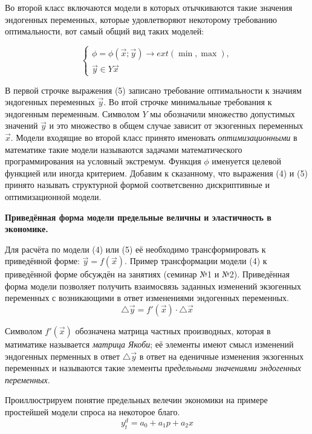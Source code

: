\documentclass[12pt,a4paper]{article}
\begin{document}
Во второй класс включаются модели в которых отычкиваются такие значения эндогенных переменных, которые удовлетворяют некоторому требованию оптимальности, вот самый общий вид таких моделей:

\begin{equation}
\begin{cases}
\phi = \phi(\vec{x};\vec{y}) \rightarrow ext (\min, \max),\\
\vec{y} \in Y{\vec{x}}
\end{cases}
\end{equation}

В первой строчке выражения (5) записано требование оптимальности к значиям эндогенных переменных $\vec{y}$. Во втой строчке минимальные требования к эндогенным переменным. Символом $Y$ мы обозначили множество допустимых значений $\vec{y}$ и это множество в общем случае зависит от экзогенных переменных $\vec{x}$. Модели входящие во второй класс принято именовать \textit{оптимизационными} в математике такие модели называются задачами математического программирования на условный экстремум. Функция $\phi$ именуется целевой функцией или иногда критерием. Добавим к сказанному, что выражения (4) и (5) принято называть структурной формой соответсвенно дискриптивные и оптимизационной модели. 

\begin{center}
\textbf{Приведённая форма модели предельные величны и эластичность в экономике.}
\end{center}

Для расчёта по модели (4) или (5) её необходимо трансформировать к приведённой форме: $\vec{y} = f(\vec{x})$. Пример трансформации модели (4) к приведённой форме обсуждён на занятиях (семинар №1 и №2). Приведённая форма модели позволяет получить взаимосвязь заданных изменений экзогенных переменных с возникающими в ответ изменениями эндогенных переменных. 
\begin{equation}
\triangle \vec{y} = f'(\vec{x}) \cdot \triangle \vec{x}
\end{equation}

Символом $f'(\vec{x})$ обозначена матрица частных производных, которая в матиматике называется \textit{матрица Якоби}; её элементы имеют смысл изменений эндогенных перменных в ответ $\triangle \vec{y}$ в ответ на еденичные изменения экзогенных переменных и называются такие элементы п\textit{редельными значениями эндогенных переменных}. 

Проиллюстрируем понятие предельных велечин экономики на примере простейшей модели спроса на некоторое благо.
$$y_t^d = a_0 + a_1 p + a_2  x$$
\end{document}
